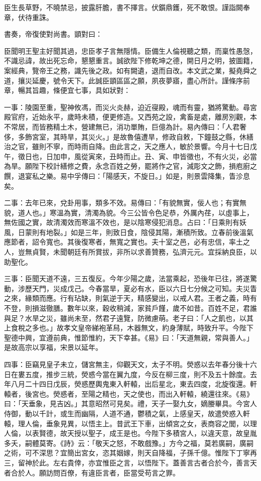 \begin{pinyinscope}
臣生長草野，不曉禁忌，披露肝膽，書不擇言。伏鑕鼎鑊，死不敢恨。謹詣闕奉章，伏待重誅。

書奏，帝復使對尚書。顗對曰：

臣聞明王聖主好聞其過，忠臣孝子言無隱情。臣備生人倫視聽之類，而稟性愚愨，不識忌諱，故出死忘命，懇懇重言。誠欲陛下修乾坤之德，開日月之明，披圖籍，案經典，覽帝王之務，識先後之政。如有闕遺，退而自改。本文武之業，擬堯舜之道，攘災延慶，號令天下。此誠臣顗區區之願，夙夜夢寤，盡心所計。謹條序前章，暢其旨趣，條便宜七事，具如狀對：

一事：陵園至重，聖神攸馮，而災火炎赫，迫近寑殿，魂而有靈，猶將驚動。尋宮殿官府，近始永平，歲時未積，便更修造。又西苑之設，禽畜是處，離房別觀，本不常居，而皆務精土木，營建無已，消功單賄，巨億為計。易內傳曰：「人君奢侈，多飾宮室，其時旱，其災火。」是故魯僖遭旱，修政自敕，下鐘鼓之縣，休繕治之官，雖則不寧，而時雨自降。由此言之，天之應人，敏於景響。今月十七日戊午，徵日也，日加申，風從寅來，丑時而止。丑、寅、申皆徵也，不有火災，必當為旱。願陛下校計繕修之費，永念百姓之勞，罷將作之官，減彫文之飾，損庖廚之饌，退宴私之樂。易中孚傳曰：「陽感天，不旋日。」如是，則景雲降集，眚沴息矣。

二事：去年已來，兌卦用事，類多不效。易傳曰：「有貌無實，佞人也；有實無貌，道人也。」寒溫為實，清濁為貌。今三公皆令色足恭，外厲內荏，以虛事上，無佐國之實，故清濁效而寒溫不效也，是以陰寒侵犯消息。占曰：「日乘則有妖風，日蒙則有地裂。」如是三年，則致日食，陰侵其陽，漸積所致。立春前後溫氣應節者，詔令寬也。其後復寒者，無寬之實也。夫十室之邑，必有忠信，率土之人，豈無貞賢，未聞朝廷有所賞拔，非所以求善贊務，弘濟元元。宜採納良臣，以助聖化。

三事：臣聞天道不遠，三五復反。今年少陽之歲，法當乘起，恐後年已往，將遂驚動，涉歷天門，災成戊己。今春當旱，夏必有水，臣以六日七分候之可知。夫災眚之來，緣類而應。行有玷缺，則氣逆于天，精感變出，以戒人君。王者之義，時有不登，則損滋徹膳。數年以來，穀收稍減，家貧戶饉，歲不如昔。百姓不足，君誰與足？水旱之災，雖尚未至，然君子遠覽，防微慮萌。老子曰：「人之飢也，以其上食稅之多也。」故孝文皇帝綈袍革舄，木器無文，約身薄賦，時致升平。今陛下聖德中興，宜遵前典，惟節惟約，天下幸甚。《易》曰：「天道無親，常與善人。」是故高宗以享福，宋景以延年。

四事：臣竊見皇子未立，儲宮無主，仰觀天文，太子不明。熒惑以去年春分後十六日在婁五度，推步三統，熒惑今當在翼九度，今反在柳三度，則不及五十餘度。去年八月二十四日戊辰，熒惑歷輿鬼東入軒轅，出后星北，東去四度，北旋復還。軒轅者，後宮也。熒惑者，至陽之精也，天之使也，而出入軒轅，繞還往來。《易》曰：「天垂象，見吉凶。」其意昭然可見矣。禮，天子一娶九女，嫡媵畢具。今宮人侍御，動以千計，或生而幽隔，人道不通，鬱積之氣，上感皇天，故遣熒惑入軒轅，理人倫，垂象見異，以悟主上。昔武王下車，出傾宮之女，表商容之閭，以理人倫，以表賢德，故天授以聖子，成王是也。今陛下多積宮人，以違天意，故皇胤多夭，嗣體莫寄。《詩》云：「敬天之怒，不敢戲豫。」方今之福，莫若廣嗣，廣嗣之術，可不深思？宜簡出宮女，恣其姻嫁，則天自降福，子孫千億。惟陛下丁寧再三，留神於此。左右貴倖，亦宜惟臣之言，以悟陛下。蓋善言古者合於今，善言天者合於人。願訪問百僚，有違臣言者，臣當受苟言之罪。


\end{pinyinscope}
